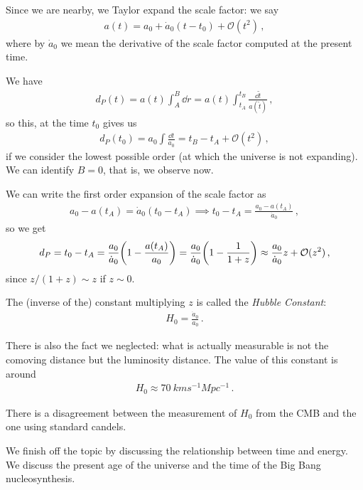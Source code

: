 \documentclass[main.tex]{subfiles}
\begin{document}
Since we are nearby, we Taylor expand the scale factor: we say 
%
\begin{align}
a(t) = a_0 + \dot{a}_{0} (t - t_0 ) + \mathcal{O}(t^2)
\,,
\end{align}
%
where by \(\dot{a}_{0}\) we mean the derivative of the scale factor computed at the present time.

We have 
%
\begin{align}
d_{P}(t) = a(t) \int_{A}^{B} \dd{r} = a(t) \int_{t_A}^{t_B} \frac{ \dd{\widetilde{t}}}{a (\widetilde{t})}
\,,
\end{align}
%
so this, at the time \(t_0\) gives us 
%
\begin{align}
d_P (t_0 ) = a_0 \int \frac{\dd{t}}{a_0 } = t_B - t_A + \mathcal{O}(t^2)
\,,
\end{align}
%
if we consider the lowest possible order (at which the universe is not expanding).
We can identify \(B = 0\), that is, we observe now.

We can write the first order expansion of the scale factor as 
%
\begin{align}
a_0 - a(t_A) = \dot{a}_{0} (t_0 - t_A) \implies
t_{0} - t_A = \frac{a_0 - a(t_A)}{\dot{a}_{0}}
\,,
\end{align}
%
so we get 
%
\begin{align}
d_P = t_0 - t_A = \frac{a_0 }{\dot{a}_{0}} \qty(1 - \frac{a(t_A)}{a_0 }) 
= \frac{a_0 }{\dot{a}_{0}} \qty(1 - \frac{1}{1+z})
\approx \frac{a_0 }{ \dot{a}_{0}} z + \mathcal{O} (z^2)
\,,
\end{align}
%
since \(z / (1+z) \sim z \) if \(z \sim 0\). 

The (inverse of the) constant multiplying \(z\) is called the \emph{Hubble Constant}: 
%
\begin{align}
H_0 = \frac{\dot{a}_{0}}{a_0 }
\,.
\end{align}

There is also the fact we neglected: what is actually measurable is not the comoving distance but the luminosity distance. 
The value of this constant is around 
%
\begin{align}
H_0 \approx \SI{70}{km s^{-1} Mpc^{-1}}
\,.
\end{align}

There is a disagreement between the measurement of \(H_0 \) from the CMB and the one using standard candels. 

We finish off the topic by discussing the relationship between time and energy. We discuss the present age of the universe and the time of the Big Bang nucleosynthesis. 
\end{document}
